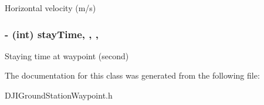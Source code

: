 Horizontal velocity (m/s) \hypertarget{interface_d_j_i_ground_station_waypoint_af492d8fd1160afec55ba567bc9d40f5a}{
\subsubsection[{stay\+Time}]{\setlength{\rightskip}{0pt plus 5cm}-\/ (int) stay\+Time\hspace{0.3cm}{\ttfamily [read]}, {\ttfamily [write]}, {\ttfamily [nonatomic]}, {\ttfamily [assign]}}}\label{interface_d_j_i_ground_station_waypoint_af492d8fd1160afec55ba567bc9d40f5a}
Staying time at waypoint (second) 

The documentation for this class was generated from the following file\+:\begin{DoxyCompactItemize}
\item 
D\+J\+I\+Ground\+Station\+Waypoint.\+h\end{DoxyCompactItemize}
